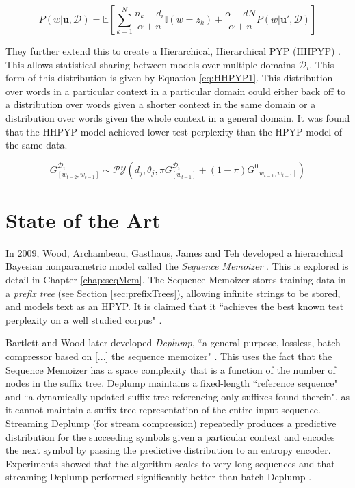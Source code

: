 \begin{equation}
P(w|\boldsymbol{u},\mathcal{D})=\mathbb{E}\left[\sum_{k=1}^{N}\frac{n_{k}-d_{i}}{\alpha+n}\mathbb{I}(w=z_{k})+\frac{\alpha+dN}{\alpha+n}P(w|\boldsymbol{u}',\mathcal{D})\right]
\label{eq:HBNASLMDA2.1posterior}
\end{equation}

They further extend this to create a Hierarchical, Hierarchical PYP (HHPYP) \cite{wood2008hierarchical} . This allows statistical sharing between models over multiple domains $\mathcal{D}_{i}$. This form of this distribution is given by Equation \ref{eq:HHPYP1}. This distribution over words in a particular context in a particular domain could either back off to a distribution over words given a shorter context in the same domain or a distribution over words given the whole context in a general domain. It was found that the HHPYP model achieved lower test perplexity than the HPYP model of the same data. 



\begin{equation}
G_{[w_{t-2},w_{t-1}]}^{\mathcal{D}_{i}}\sim\mathcal{PY}(d_{j},\theta_{j},\pi G_{[w_{t-1}]}^{\mathcal{D}_{i}}+(1-\pi)G_{[w_{t-1},w_{t-1}]}^{0})
\label{eq:HHPYP1}
\end{equation}


\section{State of the Art}

In 2009, Wood, Archambeau, Gasthaus, James and Teh developed a hierarchical Bayesian nonparametric model called the \textit{Sequence Memoizer} \cite{wood2009stochastic} \cite{wood2011sequence}. This is explored is detail in Chapter \ref{chap:seqMem}. The Sequence Memoizer stores training data in a \textit{prefix tree} (see Section \ref{sec:prefixTrees}), allowing infinite strings to be stored, and models text as an HPYP. It is claimed that it ``achieves the best known test perplexity on a well studied corpus" \cite{wood2009stochastic}.

Bartlett and Wood later developed \textit{Deplump}, ``a general purpose, lossless, batch compressor based on [...] the sequence memoizer" \cite{bartlett2011deplump}. This uses the fact that the Sequence Memoizer has a space complexity that is a function of the number of nodes in the suffix tree. Deplump maintains a fixed-length ``reference sequence" and ``a dynamically updated suffix tree referencing only suffixes found therein", as it cannot maintain a suffix tree representation of the entire input sequence. Streaming Deplump (for stream compression) repeatedly produces a predictive distribution for the succeeding symbols given a particular context and encodes the next symbol by passing the predictive distribution to an entropy encoder. Experiments showed that the algorithm scales to very long sequences and that streaming Deplump performed significantly better than batch Deplump .

